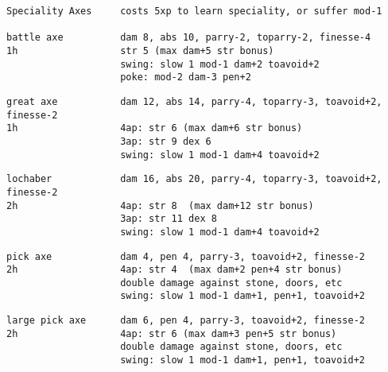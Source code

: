 \goodbreak \small \begin{samepage} \begin{verbatim}
Speciality Axes     costs 5xp to learn speciality, or suffer mod-1

battle axe          dam 8, abs 10, parry-2, toparry-2, finesse-4
1h                  str 5 (max dam+5 str bonus)
                    swing: slow 1 mod-1 dam+2 toavoid+2
                    poke: mod-2 dam-3 pen+2
\end{verbatim} \blocklistgap \begin{verbatim}
great axe           dam 12, abs 14, parry-4, toparry-3, toavoid+2, finesse-2
1h                  4ap: str 6 (max dam+6 str bonus)
                    3ap: str 9 dex 6
                    swing: slow 1 mod-1 dam+4 toavoid+2
\end{verbatim} \blocklistgap \begin{verbatim}
lochaber            dam 16, abs 20, parry-4, toparry-3, toavoid+2, finesse-2
2h                  4ap: str 8  (max dam+12 str bonus)
                    3ap: str 11 dex 8
                    swing: slow 1 mod-1 dam+4 toavoid+2
\end{verbatim} \blocklistgap \begin{verbatim}
pick axe            dam 4, pen 4, parry-3, toavoid+2, finesse-2
2h                  4ap: str 4  (max dam+2 pen+4 str bonus)
                    double damage against stone, doors, etc
                    swing: slow 1 mod-1 dam+1, pen+1, toavoid+2
\end{verbatim} \blocklistgap \begin{verbatim}
large pick axe      dam 6, pen 4, parry-3, toavoid+2, finesse-2
2h                  4ap: str 6 (max dam+3 pen+5 str bonus)
                    double damage against stone, doors, etc
                    swing: slow 1 mod-1 dam+1, pen+1, toavoid+2
\end{verbatim} \end{samepage} \normalsize \goodbreak

\

